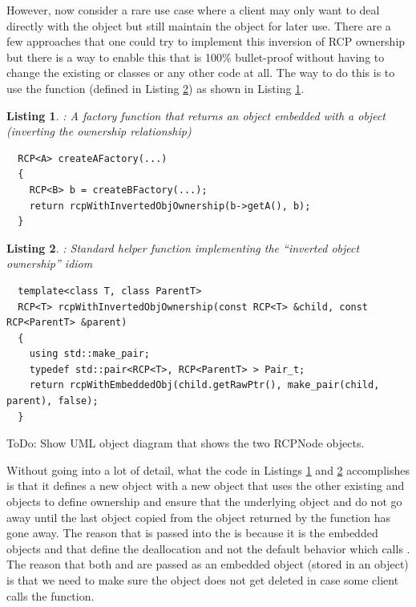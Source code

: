 \documentclass[pdf,ps2pdf,11pt]{SANDreport}
\newtheorem{listing}{Listing}
\begin{document}
However, now consider a rare use case where a client may only want to
deal directly with the {} object but still maintain the
{} object for later use.  There are a few approaches that
one could try to implement this inversion of RCP ownership but there
is a way to enable this that is 100\% bullet-proof without having to
change the existing {} or {} classes or any other
code at all.  The way to do this is to use the
{} function (defined in
Listing {}\ref{listing:rcpWithInvertedObjOwnership}) as shown in
Listing {}\ref{listing:A_owns_B_owns_A}.

\begin{listing}: A factory function that returns an {} object
embedded with a {} object (inverting the ownership relationship) \\
\label{listing:A_owns_B_owns_A}
{\small\begin{verbatim}
  RCP<A> createAFactory(...)
  {
    RCP<B> b = createBFactory(...);
    return rcpWithInvertedObjOwnership(b->getA(), b);
  }
\end{verbatim}}
\end{listing}


\begin{listing}: Standard helper function implementing the ``inverted
object ownership'' idiom \\
\label{listing:rcpWithInvertedObjOwnership}
{\small\begin{verbatim}
  template<class T, class ParentT>
  RCP<T> rcpWithInvertedObjOwnership(const RCP<T> &child, const RCP<ParentT> &parent)
  {
    using std::make_pair;
    typedef std::pair<RCP<T>, RCP<ParentT> > Pair_t;
    return rcpWithEmbeddedObj(child.getRawPtr(), make_pair(child, parent), false);
  }
\end{verbatim}}
\end{listing}


ToDo: Show UML object diagram that shows the two RCPNode objects.


Without going into a lot of detail, what the code in Listings
{}\ref{listing:A_owns_B_owns_A} and
{}\ref{listing:rcpWithInvertedObjOwnership} accomplishes is that it
defines a new {} object with a new {}
object that uses the other existing {} and
{} objects to define ownership and ensure that the
underlying {} object and {} do not go away until
the last {} object copied from the object returned by
the function {} has gone away.  The reason
that {} is passed into the
{} is because it is the embedded
objects {} and {} that define the
deallocation and not the default behavior which calls
{}.  The reason that both {} and
{} are passed as an embedded object (stored in an
{} object) is that we need to make sure the
{} object does not get deleted in case some client calls the
{} function.
\end{document}
